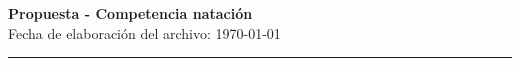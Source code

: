 \begin{center}
    \textbf{
        \changefontsizes{17.28pt}
        Propuesta - Competencia natación}\\

    Fecha de elaboración del archivo: \today
\end{center}
\hrule